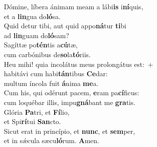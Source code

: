 \evenverse Dómine, líbera ánimam meam a lábi\textbf{is} i\textbf{ní}quis,~\*\\
\evenverse et a \textbf{lin}gua do\textbf{ló}sa.\\
\oddverse Quid detur tibi, aut quid appo\textbf{ná}tur \textbf{ti}bi~\*\\
\oddverse ad \textbf{lin}guam do\textbf{ló}sam?\\
\evenverse Sagíttæ po\textbf{tén}tis a\textbf{cú}tæ,~\*\\
\evenverse cum carbónibus de\textbf{so}la\textbf{tó}riis.\\
\oddverse Heu mihi! quia incolátus meus prolongátus est:~+\\
\oddverse  habitávi cum habi\textbf{tán}tibus \textbf{Ce}dar:~\*\\
\oddverse multum íncola fuit \textbf{á}nima \textbf{me}a.\\
\evenverse Cum his, qui odérunt pacem, \textbf{e}ram pa\textbf{cí}ficus:~\*\\
\evenverse cum loquébar illis, impu\textbf{gná}bant me \textbf{gra}tis.\\
\oddverse Glória \textbf{Pa}tri, et \textbf{Fí}lio,~\*\\
\oddverse et Spi\textbf{rí}tui \textbf{San}cto.\\
\evenverse Sicut erat in princípio, et \textbf{nunc}, et \textbf{sem}per,~\*\\
\evenverse et in sǽcula sæcu\textbf{ló}rum. \textbf{A}men.\\
